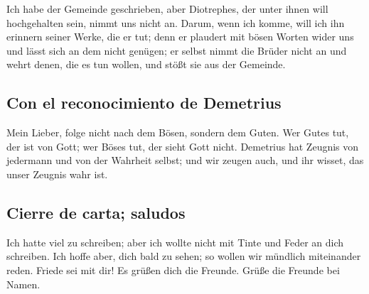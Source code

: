  Ich habe der Gemeinde geschrieben, aber Diotrephes, der
unter ihnen will hochgehalten sein, nimmt uns nicht an. 
Darum, wenn ich komme, will ich ihn erinnern seiner Werke, die er tut;
denn er plaudert mit bösen Worten wider uns und lässt sich an dem nicht
genügen; er selbst nimmt die Brüder nicht an und wehrt denen, die es tun
wollen, und stößt sie aus der Gemeinde.

\hypertarget{con-el-reconocimiento-de-demetrius}{%
\subsection{Con el reconocimiento de
Demetrius}\label{con-el-reconocimiento-de-demetrius}}

 Mein Lieber, folge nicht nach dem Bösen, sondern dem
Guten. Wer Gutes tut, der ist von Gott; wer Böses tut, der sieht Gott
nicht.  Demetrius hat Zeugnis von jedermann und von der
Wahrheit selbst; und wir zeugen auch, und ihr wisset, das unser Zeugnis
wahr ist.

\hypertarget{cierre-de-carta-saludos}{%
\subsection{Cierre de carta; saludos}\label{cierre-de-carta-saludos}}

 Ich hatte viel zu schreiben; aber ich wollte nicht mit
Tinte und Feder an dich schreiben.  Ich hoffe aber, dich
bald zu sehen; so wollen wir mündlich miteinander reden. 
Friede sei mit dir! Es grüßen dich die Freunde. Grüße die Freunde bei
Namen.
